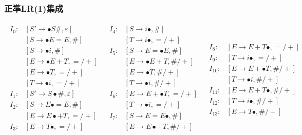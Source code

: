 \documentclass[dvipdfmx,cjk]{beamer}
\begin{document}
\begin{frame}
  \frametitle{正準LR(1)集成}
  {\tiny
    \[
      \begin{array}{ccc}
        \begin{array}{cl}
          I_0: & [S'\rightarrow\bullet S\#,\varepsilon] \\
               & [S\rightarrow\bullet E=E,\#]           \\
               & [S\rightarrow\bullet i,\#]             \\
               & [E\rightarrow\bullet E+T,=/+]          \\
               & [E\rightarrow\bullet T,=/+]            \\
               & [T\rightarrow\bullet i,=/+]            \\
          I_1: & [S'\rightarrow S\bullet\#,\varepsilon] \\
          I_2: & [S\rightarrow E\bullet=E,\#]           \\
               & [E\rightarrow E\bullet+T,=/+]          \\
          I_3: & [E\rightarrow T\bullet,=/+]            \\
        \end{array} &
        \begin{array}{cl}
          I_4: & [S\rightarrow i\bullet,\#]     \\
               & [T\rightarrow i\bullet,=/+]    \\
          I_5: & [S\rightarrow E=\bullet E,\#]  \\
               & [E\rightarrow\bullet E+T,\#/+] \\
               & [E\rightarrow\bullet T,\#/+]   \\
               & [T\rightarrow\bullet i,\#/+]   \\
          I_6: & [E\rightarrow E+\bullet T,=/+] \\
               & [T\rightarrow \bullet i,=/+]   \\
          I_7: & [S\rightarrow E=E\bullet,\#]   \\
               & [E\rightarrow E\bullet+T,\#/+] \\
        \end{array}         &
        \begin{array}{cl}
          I_8:    & [E\rightarrow E+T\bullet,=/+]   \\
          I_9:    & [T\rightarrow i\bullet,=/+]     \\
          I_{10}: & [E\rightarrow E+\bullet T,\#/+] \\
                  & [T\rightarrow \bullet i,\#/+]   \\
          I_{11}: & [E\rightarrow E+T\bullet,\#/+]  \\
          I_{12}: & [T\rightarrow i\bullet,\#/+]    \\
          I_{13}: & [E\rightarrow T\bullet,\#/+]
        \end{array}
      \end{array}
    \]}


\end{frame}
\end{document}
